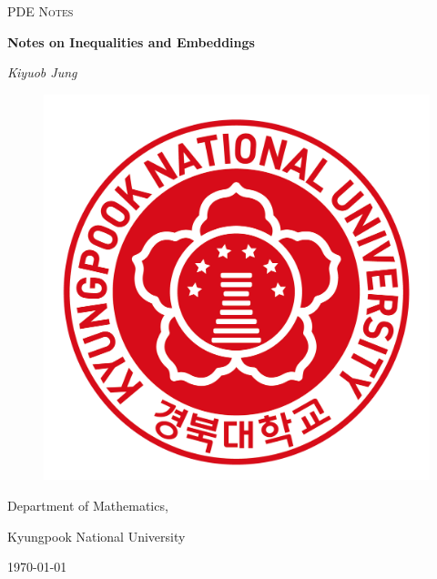 \documentclass[11pt,a4paper]{report}
\theoremstyle{definition}
\begin{document}
\begin{titlepage}
	\centering
	{\scshape\LARGE PDE Notes \par}
	\vspace{1cm}
	{\scshape\Large \par}
	\vspace{1.5cm}
	{\huge\bfseries Notes on Inequalities and Embeddings\par}
	\vspace{2cm}
	{\Large\itshape Kiyuob Jung\par}
	\vspace{7cm}
	
	\begin{figure}[H] 
	\centering 
	\includegraphics[scale=0.4]{Illustration/Logo.png} 
	\end{figure}
	\vspace{2cm}

	Department of Mathematics,\par
	Kyungpook National University
	
	\vfill

	{\large \today\par}
\end{titlepage}

\newpage

\tableofcontents
\end{document}
